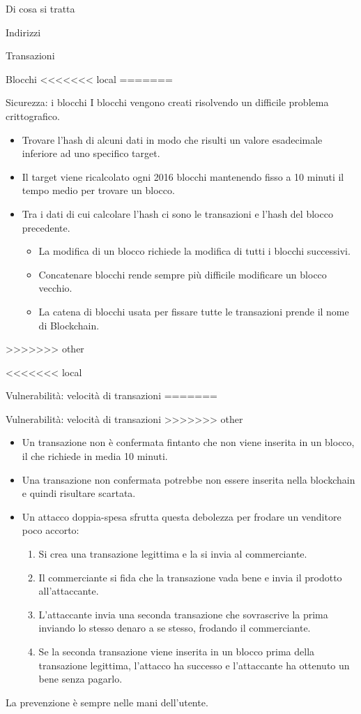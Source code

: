 \documentclass[italian]{beamer}
\begin{document}
\begin{frame}{Di cosa si tratta}
\begin{frame}{Indirizzi}
\begin{frame}{Transazioni}
\begin{frame}{Blocchi}
<<<<<<< local
=======
\begin{frame}{Sicurezza: i blocchi}
I blocchi vengono creati risolvendo un difficile problema crittografico.
\begin{itemize}
  \item Trovare l'hash di alcuni dati in modo che risulti un valore esadecimale inferiore ad uno specifico target.
  \item Il target viene ricalcolato ogni 2016 blocchi mantenendo fisso a 10 minuti il tempo medio per trovare un blocco.
  \item Tra i dati di cui calcolare l'hash ci sono le transazioni e l'hash del blocco precedente.
  \begin{itemize}
    \item La modifica di un blocco richiede la modifica di tutti i blocchi successivi.
    \item Concatenare blocchi rende sempre più difficile modificare un blocco vecchio.
    \item La catena di blocchi usata per fissare tutte le transazioni prende il nome di Blockchain.
  \end{itemize}
\end{itemize}
\end{frame}
>>>>>>> other

<<<<<<< local
\begin{frame}{Vulnerabilità: velocità di transazioni} %
=======

\begin{frame}{Vulnerabilità: velocità di transazioni}
>>>>>>> other
 \begin{itemize}
  \item Un transazione non è confermata fintanto che non viene inserita in un blocco, il che richiede in media 10 minuti.
  \item Una transazione non confermata potrebbe non essere inserita nella blockchain e quindi risultare scartata.
  \item Un attacco doppia-spesa sfrutta questa debolezza per frodare un venditore poco accorto: \pause
  \begin{enumerate}
   \item Si crea una transazione legittima e la si invia al commerciante. \pause
   \item Il commerciante si fida che la transazione vada bene e invia il prodotto all'attaccante. \pause
   \item L'attaccante invia una seconda transazione che sovrascrive la prima inviando lo stesso denaro a se stesso, frodando il commerciante. \pause
   \item Se la seconda transazione viene inserita in un blocco prima della transazione legittima, l'attacco ha successo e l'attaccante ha ottenuto un bene senza pagarlo.
  \end{enumerate}
 \end{itemize}
 \pause
 La prevenzione è sempre nelle mani dell'utente.
\end{frame}


\end{frame}
\end{frame}
\end{frame}
\end{frame}
\end{frame}
\end{document}
